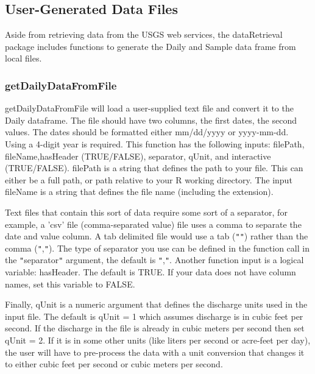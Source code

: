 \documentclass[a4paper,11pt]{article}\usepackage[]{graphicx}\usepackage[]{color}
\begin{document}
\subsection{User-Generated Data Files}
Aside from retrieving data from the USGS web services, the dataRetrieval package includes functions to generate the Daily and Sample data frame from local files.

\subsubsection{getDailyDataFromFile}
getDailyDataFromFile will load a user-supplied text file and convert it to the Daily dataframe. The file should have two columns, the first dates, the second values.  The dates should be formatted either mm/dd/yyyy or yyyy-mm-dd. Using a 4-digit year is required. This function has the following inputs: filePath, fileName,hasHeader (TRUE/FALSE), separator, qUnit, and interactive (TRUE/FALSE). filePath is a string that defines the path to your file. This can either be a full path, or path relative to your R working directory. The input fileName is a string that defines the file name (including the extension).

Text files that contain this sort of data require some sort of a separator, for example, a 'csv' file (comma-separated value) file uses a comma to separate the date and value column. A tab delimited file would use a tab (\texttt{"}\verb@\t@\texttt{"}) rather than the comma (\texttt{"},\texttt{"}). The type of separator you use can be defined in the function call in the \texttt{"}separator\texttt{"} argument, the default is \texttt{"},\texttt{\texttt{"}}. Another function input is a logical variable: hasHeader.  The default is TRUE. If your data does not have column names, set this variable to FALSE.

Finally, qUnit is a numeric argument that defines the discharge units used in the input file.  The default is qUnit = 1 which assumes discharge is in cubic feet per second.  If the discharge in the file is already in cubic meters per second then set qUnit = 2.  If it is in some other units (like liters per second or acre-feet per day), the user will have to pre-process the data with a unit conversion that changes it to either cubic feet per second or cubic meters per second.
\end{document}
